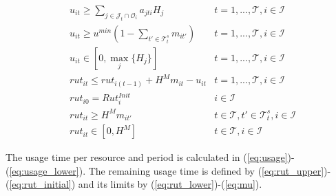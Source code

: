 \documentclass[a4paper,onecolumn,fleqn]{article}
\begin{document}
    \begin{align}
         & u_{it} \geq \sum_{j \in \mathcal{J}_t \cap \mathcal{O}_i} a_{jti} H_j 
            & t =1, ..., \mathcal{T}, i \in \mathcal{I} \label{eq:usage}\\
         & u_{it} \geq u^{min} (1 - \sum_{t' \in \mathcal{T}^{s}_t} m_{it'})
            & t =1, ..., \mathcal{T}, i \in \mathcal{I} \label{eq:usage}\\
         & u_{it} \in [0, \max_j{\{H_j\}}]
            & t =1, ..., \mathcal{T}, i \in \mathcal{I} \label{eq:usage_lower}\\
         & rut_{it} \leq rut_{i(t-1)} + H^{M} m_{it} - u_{it}
            & t =1, ..., \mathcal{T}, i \in \mathcal{I} \label{eq:rut_upper}\\
        & rut_{i0} = Rut^{Init}_i
               & i \in \mathcal{I} \label{eq:rut_initial}\\
        & rut_{it} \geq H^{M} m_{it'}
                & t \in \mathcal{T}, t' \in \mathcal{T}^{s}_t, i \in \mathcal{I}\label{eq:rut_lower}\\ 
        & rut_{it} \in [0,H^{M}]
                & t \in \mathcal{T}, i \in \mathcal{I} \label{eq:mu}              
    \end{align}

    The usage time per resource and period is calculated in (\ref{eq:usage})-(\ref{eq:usage_lower}). The remaining usage time is defined by (\ref{eq:rut_upper})-(\ref{eq:rut_initial}) and its limits by (\ref{eq:rut_lower})-(\ref{eq:mu}). 
\end{document}

